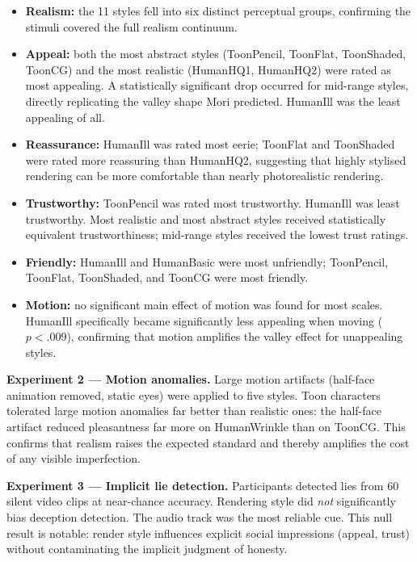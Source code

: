 \documentclass[11pt, a4paper]{article}
\begin{document}
\begin{itemize}[leftmargin=2em]
  \item \textbf{Realism:} the 11 styles fell into six distinct perceptual groups, confirming the stimuli covered the full realism continuum.
  \item \textbf{Appeal:} both the most abstract styles (ToonPencil, ToonFlat, ToonShaded, ToonCG) and the most realistic (HumanHQ1, HumanHQ2) were rated as most appealing. A statistically significant drop occurred for mid-range styles, directly replicating the valley shape Mori predicted. HumanIll was the least appealing of all.
  \item \textbf{Reassurance:} HumanIll was rated most eerie; ToonFlat and ToonShaded were rated more reassuring than HumanHQ2, suggesting that highly stylised rendering can be more comfortable than nearly photorealistic rendering.
  \item \textbf{Trustworthy:} ToonPencil was rated most trustworthy. HumanIll was least trustworthy. Most realistic and most abstract styles received statistically equivalent trustworthiness; mid-range styles received the lowest trust ratings.
  \item \textbf{Friendly:} HumanIll and HumanBasic were most unfriendly; ToonPencil, ToonFlat, ToonShaded, and ToonCG were most friendly.
  \item \textbf{Motion:} no significant main effect of motion was found for most scales. HumanIll specifically became significantly less appealing when moving ($p < .009$), confirming that motion amplifies the valley effect for unappealing styles.
\end{itemize}

\textbf{Experiment 2 --- Motion anomalies.} Large motion artifacts (half-face animation removed, static eyes) were applied to five styles. Toon characters tolerated large motion anomalies far better than realistic ones: the half-face artifact reduced pleasantness far more on HumanWrinkle than on ToonCG. This confirms that realism raises the expected standard and thereby amplifies the cost of any visible imperfection.

\textbf{Experiment 3 --- Implicit lie detection.} Participants detected lies from 60 silent video clips at near-chance accuracy. Rendering style did \textit{not} significantly bias deception detection. The audio track was the most reliable cue. This null result is notable: render style influences explicit social impressions (appeal, trust) without contaminating the implicit judgment of honesty.
\end{document}
